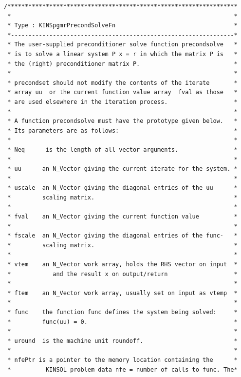 \documentclass[11pt]{article}
\begin{document}
\begin{verbatim}
/******************************************************************
 *                                                                *
 * Type : KINSpgmrPrecondSolveFn                                  *
 *----------------------------------------------------------------*
 * The user-supplied preconditioner solve function precondsolve   *
 * is to solve a linear system P x = r in which the matrix P is   *
 * the (right) preconditioner matrix P.                           *
 *                                                                *
 * precondset should not modify the contents of the iterate       *
 * array uu  or the current function value array  fval as those   *
 * are used elsewhere in the iteration process.                   *
 *                                                                *
 * A function precondsolve must have the prototype given below.   *
 * Its parameters are as follows:                                 *
 *                                                                *
 * Neq      is the length of all vector arguments.                *
 *                                                                *
 * uu      an N_Vector giving the current iterate for the system. *
 *                                                                *
 * uscale  an N_Vector giving the diagonal entries of the uu-     *
 *         scaling matrix.                                        *
 *                                                                *
 * fval    an N_Vector giving the current function value          *
 *                                                                *
 * fscale  an N_Vector giving the diagonal entries of the func-   *
 *         scaling matrix.                                        *
 *                                                                *
 * vtem    an N_Vector work array, holds the RHS vector on input  *
 *            and the result x on output/return                   *
 *                                                                *
 * ftem    an N_Vector work array, usually set on input as vtemp  *
 *                                                                *
 * func    the function func defines the system being solved:     *
 *         func(uu) = 0.                                          *
 *                                                                *
 * uround  is the machine unit roundoff.                          *
 *                                                                *
 * nfePtr is a pointer to the memory location containing the      *
 *          KINSOL problem data nfe = number of calls to func. The*

\end{verbatim}
\end{document}

